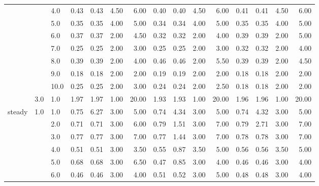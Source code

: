 \begin{tabular}{lllrrrrrrrrrrrr}
       &     & 4.0  &       0.43 &      0.43 & 4.50 &   6.00 &       0.40 &      0.40 & 4.50 &   6.00 &       0.41 &      0.41 & 4.50 &   6.00 \\
       &     & 5.0  &       0.35 &      0.35 & 4.00 &   5.00 &       0.34 &      0.34 & 4.00 &   5.00 &       0.35 &      0.35 & 4.00 &   5.00 \\
       &     & 6.0  &       0.37 &      0.37 & 2.00 &   4.50 &       0.32 &      0.32 & 2.00 &   4.00 &       0.39 &      0.39 & 2.00 &   5.00 \\
       &     & 7.0  &       0.25 &      0.25 & 2.00 &   3.00 &       0.25 &      0.25 & 2.00 &   3.00 &       0.32 &      0.32 & 2.00 &   4.00 \\
       &     & 8.0  &       0.39 &      0.39 & 2.00 &   4.00 &       0.46 &      0.46 & 2.00 &   5.50 &       0.39 &      0.39 & 2.00 &   4.50 \\
       &     & 9.0  &       0.18 &      0.18 & 2.00 &   2.00 &       0.19 &      0.19 & 2.00 &   2.00 &       0.18 &      0.18 & 2.00 &   2.00 \\
       &     & 10.0 &       0.25 &      0.25 & 2.00 &   3.00 &       0.24 &      0.24 & 2.00 &   2.50 &       0.18 &      0.18 & 2.00 &   2.00 \\
       & 3.0 & 1.0  &       1.97 &      1.97 & 1.00 &  20.00 &       1.93 &      1.93 & 1.00 &  20.00 &       1.96 &      1.96 & 1.00 &  20.00 \\
steady & 1.0 & 1.0  &       0.75 &      6.27 & 3.00 &   5.00 &       0.74 &      4.34 & 3.00 &   5.00 &       0.74 &      4.32 & 3.00 &   5.00 \\
       &     & 2.0  &       0.71 &      0.71 & 3.00 &   6.00 &       0.79 &      1.51 & 3.00 &   7.00 &       0.79 &      2.71 & 3.00 &   7.00 \\
       &     & 3.0  &       0.77 &      0.77 & 3.00 &   7.00 &       0.77 &      1.44 & 3.00 &   7.00 &       0.78 &      0.78 & 3.00 &   7.00 \\
       &     & 4.0  &       0.51 &      0.51 & 3.00 &   3.50 &       0.55 &      0.87 & 3.50 &   5.00 &       0.56 &      0.56 & 3.50 &   5.00 \\
       &     & 5.0  &       0.68 &      0.68 & 3.00 &   6.50 &       0.47 &      0.85 & 3.00 &   4.00 &       0.46 &      0.46 & 3.00 &   4.00 \\
       &     & 6.0  &       0.46 &      0.46 & 3.00 &   4.00 &       0.51 &      0.52 & 3.00 &   5.00 &       0.48 &      0.48 & 3.00 &   4.00 \\

\end{tabular}
